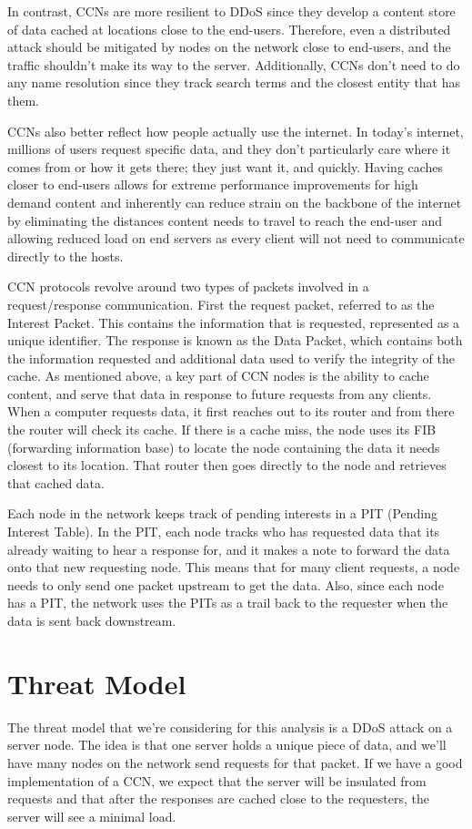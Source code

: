 \documentclass[conference,compsoc, 10pt]{IEEEtran}
\begin{document}
In contrast, CCNs are more resilient to DDoS since they develop a content store of data cached at locations close to the end-users. Therefore, even a distributed attack should be mitigated by nodes on the network close to end-users, and the traffic shouldn't make its way to the server. Additionally, CCNs don't need to do any name resolution since they track search terms and the closest entity that has them.

CCNs also better reflect how people actually use the internet. In today’s internet, millions of users request specific data, and they don't particularly care where it comes from or how it gets there; they just want it, and quickly. Having caches closer to end-users allows for extreme performance improvements for high demand content and inherently can reduce strain on the backbone of the internet by eliminating the distances content needs to travel to reach the end-user and allowing reduced load on end servers as every client will not need to communicate directly to the hosts.

CCN protocols revolve around two types of packets involved in a request/response communication. First the request packet, referred to as the Interest Packet. This contains the information that is requested, represented as a unique identifier. The response is known as the Data Packet, which contains both the information requested and additional data used to verify the integrity of the cache. As mentioned above, a key part of CCN nodes is the ability to cache content, and serve that data in response to future requests from any clients. When a computer requests data, it first reaches out to its router and from there the router will check its cache. If there is a cache miss, the node uses its FIB (forwarding information base) to locate the node containing the data it needs closest to its location. That router then goes directly to the node and retrieves that cached data. 

Each node in the network keeps track of pending interests in a PIT (Pending Interest Table). In the PIT, each node tracks who has requested data that its already waiting to hear a response for, and it makes a note to forward the data onto that new requesting node. This means that for many client requests, a node needs to only send one packet upstream to get the data. Also, since each node has a PIT, the network uses the PITs as a trail back to the requester when the data is sent back downstream.

\section{Threat Model}
The threat model that we're considering for this analysis is a DDoS attack on a server node. The idea is that one server holds a unique piece of data, and we'll have many nodes on the network send requests for that packet. If we have a good implementation of a CCN, we expect that the server will be insulated from requests and that after the responses are cached close to the requesters, the server will see a minimal load. 
\end{document}
